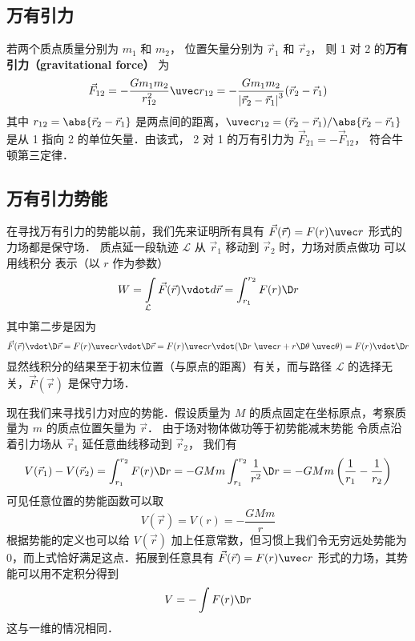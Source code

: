 

\subsection{万有引力}

若两个质点质量分别为 $m_1$ 和 $m_2$， 位置矢量分别为 $\vec r_1$ 和 $\vec r_2$， 则 1 对 2 的\textbf{万有引力（gravitational force）} 为
\begin{equation}
{\vec F_{12}} =  - \frac{{G{m_1}{m_2}}}{{{r_{12}^2}}}{\uvec r_{12}} = - \frac{{G{m_1}{m_2}}}{{{{\left| {{{\vec r}_2} - {{\vec r}_1}} \right|}^3}}}({\vec r_2} - {\vec r_1})
\end{equation}
其中 $r_{12} = \abs{\vec r_2 - \vec r_1}$ 是两点间的距离，$\uvec r_{12} = (\vec r_2 - \vec r_1)/\abs{\vec r_2 - \vec r_1}$ 是从 1 指向 2 的单位矢量．由该式， 2 对 1 的万有引力为 $\vec F_{21} = -\vec F_{12}$， 符合牛顿第三定律．

\subsection{万有引力势能}

在寻找万有引力的势能以前，我们先来证明所有具有 $\vec F(\vec r) = F(r) \uvec r$ 形式的力场都是保守场． 质点延一段轨迹 $\mathcal{L}$ 从 $\vec r_1$ 移动到 $\vec r_2$ 时，力场对质点做功 可以用线积分 表示（以 $r$ 作为参数）
\begin{equation}
W = \int\limits_\mathcal{L} {\vec F(\vec r) \vdot d\vec r} = \int_{{r_1}}^{{r_2}} {F(r) \D r} 
\end{equation}
其中第二步是因为
\begin{equation}
\vec F(\vec r) \vdot \D\vec r = F(r)\uvec r \vdot \D\vec r = F(r)\uvec  r \vdot (\D r\;\uvec  r + r\D\theta \;\uvec  \theta ) = F(r) \vdot \D r
\end{equation}
显然线积分的结果至于初末位置（与原点的距离）有关，而与路径 $\mathcal{L}$ 的选择无关，$\vec F(\vec r)$ 是保守力场．

现在我们来寻找引力对应的势能．假设质量为 $M$ 的质点固定在坐标原点，考察质量为 $m$ 的质点位置矢量为 $\vec r$． 由于场对物体做功等于初势能减末势能
令质点沿着引力场从 ${\vec r_1}$ 延任意曲线移动到 ${\vec r_2}$， 我们有
\begin{equation}
V({\vec r_1}) - V({\vec r_2}) = \int_{{r_1}}^{{r_2}} {F(r)\D r}  =  - GMm\int_{{r_1}}^{{r_2}} {\frac{1}{{{r^2}}}\D r}  =  - GMm\left( {\frac{1}{{{r_1}}} - \frac{1}{{{r_2}}}} \right)
\end{equation}
可见任意位置的势能函数可以取
\begin{equation}
V(\vec r) = V(r) = - \frac{{GMm}}{r}
\end{equation}
根据势能的定义也可以给 $V(\vec r)$ 加上任意常数，但习惯上我们令无穷远处势能为 0，而上式恰好满足这点．拓展到任意具有 $\vec F(\vec r) = F(r)\uvec r$ 形式的力场，其势能可以用不定积分得到
\begin{equation}
V = -\int F(r) \D r
\end{equation}
这与一维的情况相同．%

